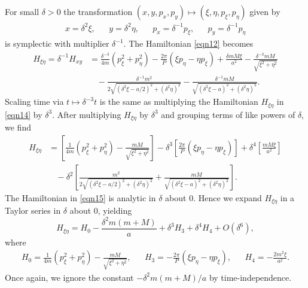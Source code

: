 \documentclass[12pt]{article}
\begin{document}
For small $\delta > 0$ the transformation $(x,y,p_x,p_y) \mapsto (\xi,\eta,p_\xi,p_\eta)$ given by
\begin{align}
x = \delta^2\xi, & & y = \delta^2\eta, & & p_x = \delta^{-1}p_\xi, & & p_y = \delta^{-1}p_\eta
\label{eqn13}
\end{align}
is symplectic with multiplier $\delta^{-1}$. The Hamiltonian \eqref{eqn12} becomes
\begin{align}
    H_{\xi\eta} = \delta^{-1}H_{xy} & = \frac{\delta^{-3}}{4m}\left(p_\xi^2 + p_\eta^2\right) - \frac{2\pi}{P}\left(\xi p_\eta - \eta p_\xi\right) + \frac{\delta mM\xi}{a^2} - \frac{\delta^{-3}mM}{\sqrt{\xi^2+\eta^2}} \nonumber\\
& \ \ \ \ - \frac{\delta^{-1}m^2}{2\sqrt{(\delta^2\xi-a/2)^2 + (\delta^2\eta)^2}} - \frac{\delta^{-1}mM}{\sqrt{(\delta^2\xi-a)^2 + (\delta^2\eta)^2}}.
\label{eqn14}
\end{align}
Scaling time via $t \mapsto \delta^{-3}t$ is the same as multiplying the Hamiltonian $H_{\xi\eta}$ in \eqref{eqn14} by $\delta^3$. After multiplying $H_{\xi\eta}$ by $\delta^3$ and grouping terms of like powers of $\delta$, we find
\begin{align}
    H_{\xi\eta} & = \left[\frac{1}{4m}\left(p_\xi^2 + p_\eta^2\right) - \frac{mM}{\sqrt{\xi^2+\eta^2}}\right] - \delta^3\left[\frac{2\pi}{P}\left(\xi p_\eta - \eta p_\xi\right)\right] + \delta^4\left[\frac{mM\xi}{a^2}\right] \nonumber\\
& \ \ \ \ - \delta^2\left[\frac{m^2}{2\sqrt{(\delta^2\xi-a/2)^2 + (\delta^2\eta)^2}} + \frac{mM}{\sqrt{(\delta^2\xi-a)^2 + (\delta^2\eta)^2}}\right].
\label{eqn15}
\end{align}
The Hamiltonian in \eqref{eqn15} is analytic in $\delta$ about $0$. Hence we expand $H_{\xi\eta}$ in a Taylor series in $\delta$ about $0$, yielding
\begin{equation}
    H_{\xi\eta} = H_0 - \frac{\delta^2m(m+M)}{a} + \delta^3H_3 + \delta^4H_4 + O(\delta^6),
    \label{eqn16}
\end{equation}
where
\begin{align}
H_0 = \frac{1}{4m}\left(p_\xi^2 + p_\eta^2\right) - \frac{mM}{\sqrt{\xi^2+\eta^2}}, & & H_3 = -\frac{2\pi}{P}\left(\xi p_\eta - \eta p_\xi\right), & & H_4 = -\frac{2m^2\xi}{a^2}.
\label{eqn17}
\end{align}
Once again, we ignore the constant $-\delta^2m(m+M)/a$ by time-independence.
\end{document}
